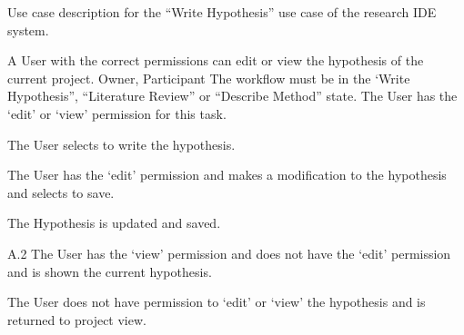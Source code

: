 \begin{table}
  \centering
  \caption{Use case description for the ``Write Hypothesis'' use case of the research IDE system.}
  \label{tbl:use-case-write-hypothesis}

  \begin{usecase}
    A User with the correct permissions can edit or view the hypothesis of the current project.
    Owner, Participant
    The workflow must be in the ‘Write Hypothesis”, “Literature Review” or “Describe Method” state. The User has the ‘edit’ or ‘view’ permission for this task.
    \ucnormal
    \begin{ucenum}
      \item The User selects to write the hypothesis.
      \item The User has the ‘edit’ permission and makes a modification to the hypothesis and selects to save.
      \item The Hypothesis is updated and saved.
    \end{ucenum}
    \begin{ucenum}
      \item [A.2] The User has the ‘view’ permission and does not have the ‘edit’ permission and is shown the current hypothesis.
    \end{ucenum}
    The User does not have permission to ‘edit’ or ‘view’ the hypothesis and is returned to project view.
  \end{usecase}
\end{table}


